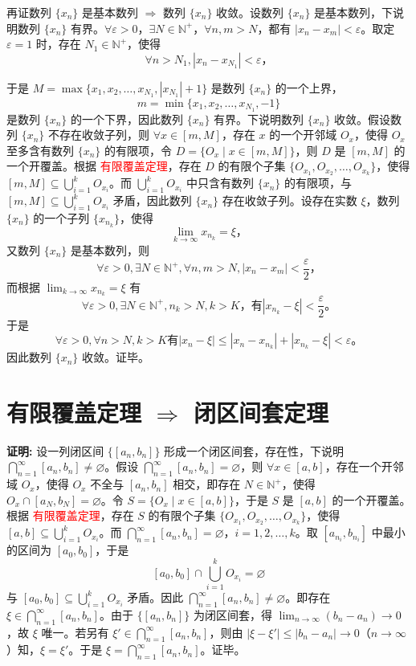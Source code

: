 \documentclass[lang=cn,newtx,10pt,scheme=chinese]{elegantbook}
\begin{document}
再证数列 $\{x_n\}$ 是基本数列 $\Rightarrow$ 数列 $\{x_n\}$ 收敛。设数列 $\{x_n\}$ 是基本数列，下说明数列 $\{x_n\}$ 有界。$\forall \varepsilon > 0$，$\exists N \in \mathbb{N}^+$，$\forall n, m > N$，都有 $|x_n - x_m| < \varepsilon$。取定 $\varepsilon = 1$ 时，存在 $N_1 \in \mathbb{N}^+$，使得
\[
\forall n > N_1, |x_n - x_{N_1}| < \varepsilon，
\]


于是 $M = \max \{x_1, x_2, \ldots, x_{N_1}, |x_{N_1}| + 1\}$ 是数列 $\{x_n\}$ 的一个上界，
\[
m = \min \{x_1, x_2, \ldots, x_{N_1}, -1\}
\]
是数列 $\{x_n\}$ 的一个下界，因此数列 $\{x_n\}$ 有界。下说明数列 $\{x_n\}$ 收敛。假设数列 $\{x_n\}$ 不存在收敛子列，则 $\forall x \in [m, M]$，存在 $x$ 的一个开邻域 $O_x$，使得 $O_x$ 至多含有数列 $\{x_n\}$ 的有限项，令 $D = \{O_x \mid x \in [m, M]\}$，则 $D$ 是 $[m, M]$ 的一个开覆盖。根据 \textcolor{red}{有限覆盖定理}，存在 $D$ 的有限个子集 $\{O_{x_1}, O_{x_2}, \ldots, O_{x_k}\}$，使得 $[m, M] \subseteq \bigcup_{i=1}^{k} O_{x_i}$。而 $\bigcup_{i=1}^{k} O_{x_i}$ 中只含有数列 $\{x_n\}$ 的有限项，与 $[m, M] \subseteq \bigcup_{i=1}^{k} O_{x_i}$ 矛盾，因此数列 $\{x_n\}$ 存在收敛子列。设存在实数 $\xi$，数列 $\{x_n\}$ 的一个子列 $\{x_{n_k}\}$，使得
\[
\lim_{k \to \infty} x_{n_k} = \xi，
\]
又数列 $\{x_n\}$ 是基本数列，则
\[
\forall \varepsilon > 0, \exists N \in \mathbb{N}^+, \forall n, m > N, |x_n - x_m| < \frac{\varepsilon}{2}，
\]
而根据 $\lim_{k \to \infty} x_{n_k} = \xi$ 有
\[
\forall \varepsilon > 0, \exists N \in \mathbb{N}^+, n_k > N, k > K，有 |x_{n_k} - \xi| < \frac{\varepsilon}{2}。
\]
于是
\[
\forall \varepsilon > 0, \forall n > N, k > K 有 |x_n - \xi| \leq |x_n - x_{n_k}| + |x_{n_k} - \xi| < \varepsilon。
\]
因此数列 $\{x_n\}$ 收敛。证毕。



\section*{有限覆盖定理 $\Rightarrow$ 闭区间套定理}

\textbf{证明:} 设一列闭区间 $\{[a_n, b_n]\}$ 形成一个闭区间套，存在性，下说明 $\bigcap_{n=1}^{\infty} [a_n, b_n] \neq \varnothing$。假设 $\bigcap_{n=1}^{\infty} [a_n, b_n] = \varnothing$，则 $\forall x \in [a, b]$，存在一个开邻域 $O_x$，使得 $O_x$ 不全与 $[a_n, b_n]$ 相交，即存在 $N \in \mathbb{N}^+$，使得 $O_x \cap [a_N, b_N] = \varnothing$。令 $S = \{O_x \mid x \in [a, b]\}$，于是 $S$ 是 $[a, b]$ 的一个开覆盖。根据 \textcolor{red}{有限覆盖定理}，存在 $S$ 的有限个子集 $\{O_{x_1}, O_{x_2}, \ldots, O_{x_k}\}$，使得 $[a, b] \subseteq \bigcup_{i=1}^{k} O_{x_i}$。而 $\bigcap_{n=1}^{\infty} [a_n, b_n] = \varnothing$，$i=1,2,\ldots,k$。取 $[a_{n_i}, b_{n_i}]$ 中最小的区间为 $[a_0, b_0]$，于是
\[
[a_0, b_0] \cap \bigcup_{i=1}^{k} O_{x_i} = \varnothing
\]
与 $[a_0, b_0] \subseteq \bigcup_{i=1}^{k} O_{x_i}$ 矛盾。因此 $\bigcap_{n=1}^{\infty} [a_n, b_n] \neq \varnothing$。即存在 $\xi \in \bigcap_{n=1}^{\infty} [a_n, b_n]$。由于 $\{[a_n, b_n]\}$ 为闭区间套，得 $\lim_{n \to \infty} (b_n - a_n) \to 0$，故 $\xi$ 唯一。若另有 $\xi' \in \bigcap_{n=1}^{\infty} [a_n, b_n]$，则由 $|\xi - \xi'| \leq |b_n - a_n| \to 0$（$n \to \infty$）知，$\xi = \xi'$。于是 $\xi = \bigcap_{n=1}^{\infty} [a_n, b_n]$。证毕。
\end{document}
